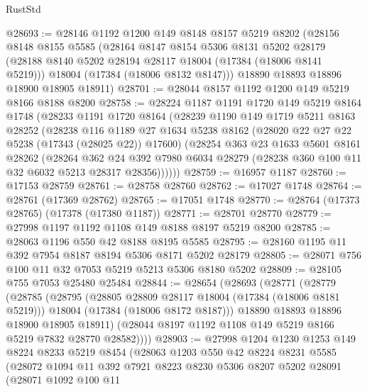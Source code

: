 \begin{lexlean}{RustStd}
\begin{coremodule}
@28693 := @28146
    @1192
    @1200
    @149
    @8148
    @8157
    @5219
    @8202
    (@28156
      @8148
      @8155
      @5585
      (@28164
        @8147
        @8154
        @5306
        @8131
        @5202
        @28179
        (@28188 @8140 @5202 @28194 @28117 @18004 (@17384 (@18006 @8141 @5219)))
        @18004
        (@17384 (@18006 @8132 @8147)))
      @18890
      @18893
      @18896
      @18900
      @18905
      @18911)
@28701 := @28044 @8157 @1192 @1200 @149 @5219 @8166 @8188 @8200
@28758 := @28224
    @1187
    @1191
    @1720
    @149
    @5219
    @8164
    @1748
    (@28233
      @1191
      @1720
      @8164
      (@28239
        @1190
        @149
        @1719
        @5211
        @8163
        @28252
        (@28238
          @116
          @1189
          @27
          @1634
          @5238
          @8162
          (@28020 @22 @27 @22 @5238 (@17343 (@28025 @22)) @17600)
          (@28254
            @363
            @23
            @1633
            @5601
            @8161
            @28262
            (@28264
              @362
              @24
              @392
              @7980
              @6034
              @28279
              (@28238 @360 @100 @11 @32 @6032 @5213 @28317 @28356))))))
@28759 := @16957 @1187
@28760 := @17153 @28759
@28761 := @28758 @28760
@28762 := @17027 @1748
@28764 := @28761 (@17369 @28762)
@28765 := @17051 @1748
@28770 := @28764 (@17373 @28765) (@17378 (@17380 @1187))
@28771 := @28701 @28770
@28779 := @27998 @1197 @1192 @1108 @149 @8188 @8197 @5219 @8200
@28785 := @28063 @1196 @550 @42 @8188 @8195 @5585
@28795 := @28160 @1195 @11 @392 @7954 @8187 @8194 @5306 @8171 @5202 @28179
@28805 := @28071 @756 @100 @11 @32 @7053 @5219 @5213 @5306 @8180 @5202
@28809 := @28105 @755 @7053 @25480 @25484
@28844 := @28654
    (@28693
      (@28771
        (@28779
          (@28785
            (@28795
              (@28805 @28809 @28117 @18004 (@17384 (@18006 @8181 @5219)))
              @18004
              (@17384 (@18006 @8172 @8187)))
            @18890
            @18893
            @18896
            @18900
            @18905
            @18911)
          (@28044 @8197 @1192 @1108 @149 @5219 @8166 @5219 @7832 @28770 @28582))))
@28903 := @27998
    @1204
    @1230
    @1253
    @149
    @8224
    @8233
    @5219
    @8454
    (@28063
      @1203
      @550
      @42
      @8224
      @8231
      @5585
      (@28072
        @1094
        @11
        @392
        @7921
        @8223
        @8230
        @5306
        @8207
        @5202
        @28091
        (@28071
          @1092
          @100
          @11

\end{coremodule}
\end{lexlean}
